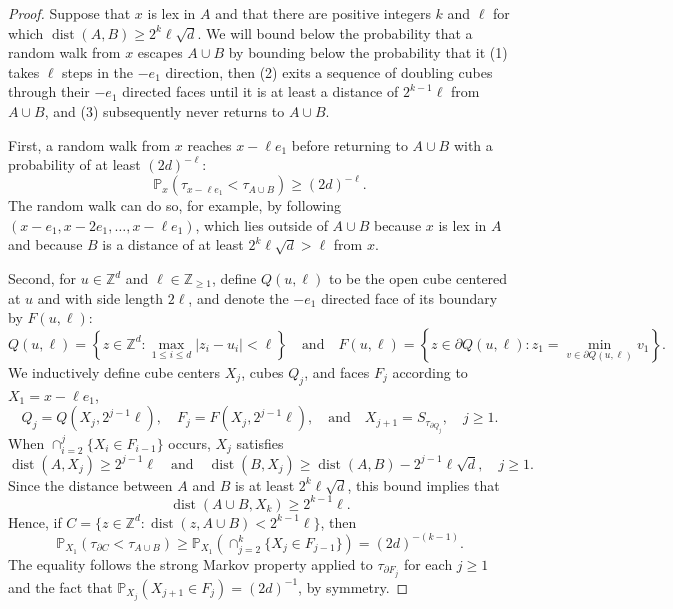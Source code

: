 \documentclass[11pt,reqno]{amsart}
\theoremstyle{definition}
\numberwithin{equation}{section}
\newcommand{\Z}{\mathbb{Z}}
\renewcommand{\P}{\mathbb{P}}
\newcommand{\1}{\mathbf{1}}
\newcommand{\bdy}{\partial}
\DeclareMathOperator{\dist}{dist}
\begin{document}
\begin{proof}
Suppose that $x$ is lex in $A$ and that there are positive integers $k$ and $\ell$ for which $\dist (A, B) \geq 2^k \ell \sqrt{d}$. We will bound below the probability that a random walk from $x$ escapes $A \cup B$ by bounding below the probability that it (1) takes $\ell$ steps in the $-e_1$ direction, then (2) exits a sequence of doubling cubes through their $-e_1$ directed faces until it is at least a distance of $2^{k-1} \ell$ from $A \cup B$, and (3) subsequently never returns to $A \cup B$.

First, a random walk from $x$ reaches $x-\ell e_1$ before returning to $A \cup B$ with a probability of at least $(2d)^{-\ell}$:
\begin{equation}\label{lex esc bd1}
\P_x (\tau_{x-\ell e_1} < \tau_{A \cup B}) \geq (2d)^{-\ell}.
\end{equation}
The random walk can do so, for example, by following $(x-e_1,x-2e_1,\dots, x - \ell e_1)$, which lies outside of $A \cup B$ because $x$ is lex in $A$ and because $B$ is a distance of at least $2^k \ell \sqrt{d} > \ell$ from $x$.

Second, for $u \in \Z^d$ and $\ell \in \Z_{\geq 1}$, define $Q (u,\ell)$ to be the open cube centered at $u$ and with side length $2\ell$, and denote the $-e_1$ directed face of its boundary by $F(u,\ell)$:
 \[
Q(u,\ell) = \left\{z \in \Z^d: \max_{1 \leq i \leq d} |z_i - u_i| < \ell \right\} \quad \text{and} \quad F(u,\ell) = \left\{z \in \bdy Q (u,\ell): z_1 = \min_{v \in \bdy Q (u,\ell)} v_1 \right\}.
 \]
We inductively define cube centers $X_j$, cubes $Q_j$, and faces $F_j$ according to $X_1 = x-\ell e_1$, 
\[
Q_j = Q(X_j,2^{j-1}\ell), \quad F_j = F(X_j,2^{j-1} \ell), \quad \text{and} \quad X_{j+1} = S_{\tau_{\bdy Q_j}}, \quad j \geq 1.
\]
When $\cap_{i=2}^j \{X_i \in F_{i-1}\}$ occurs, $X_j$ satisfies
\[
\dist (A, X_j) \geq 2^{j-1} \ell \quad \text{and} \quad \dist(B, X_j) \geq \dist (A,B) - 2^{j-1} \ell \sqrt{d}, \quad j \geq 1.
\]
Since the distance between $A$ and $B$ is at least $2^k \ell \sqrt{d}$, this bound implies that
\[
\dist (A \cup B, X_k) \geq 2^{k-1} \ell.
\]
Hence, if $C = \{z \in \Z^d: \dist(z, A \cup B) < 2^{k-1}\ell\}$, then
\begin{equation}\label{lex esc bd2}
\P_{X_1} (\tau_{\bdy C} < \tau_{A \cup B}) \geq \P_{X_1} (\cap_{j=2}^k \{X_j \in F_{j-1}\}) = (2d)^{-(k-1)}.
\end{equation}
The equality follows the strong Markov property applied to $\tau_{\bdy F_{j}}$ for each $j \geq 1$ and the fact that $\P_{X_{j}} (X_{j+1} \in F_{j}) = (2d)^{-1}$, by symmetry.




\end{proof}
\end{document}
